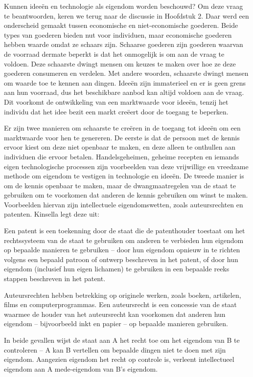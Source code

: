 Kunnen ideeën en technologie als eigendom worden beschouwd? Om deze vraag te beantwoorden, keren we terug naar de discussie in Hoofdstuk 2. Daar werd een onderscheid gemaakt tussen economische en niet-economische goederen. Beide types van goederen bieden nut voor individuen, maar economische goederen hebben waarde omdat ze schaars zijn. Schaarse goederen zijn goederen waarvan de voorraad dermate beperkt is dat het onmogelijk is om aan de vraag te voldoen. Deze schaarste dwingt mensen om keuzes te maken over hoe ze deze goederen consumeren en verdelen. Met andere woorden, schaarste dwingt mensen om waarde toe te kennen aan dingen. Ideeën zijn immaterieel en er is geen grens aan hun voorraad, dus het beschikbare aanbod kan altijd voldoen aan de vraag. Dit voorkomt de ontwikkeling van een marktwaarde voor ideeën, tenzij het individu dat het idee bezit een markt creëert door de toegang te beperken.

Er zijn twee manieren om schaarste te creëren in de toegang tot ideeën om een marktwaarde voor hen te genereren. De eerste is dat de persoon met de kennis ervoor kiest om deze niet openbaar te maken, en deze alleen te onthullen aan individuen die ervoor betalen. Handelsgeheimen, geheime recepten en iemands eigen technologische processen zijn voorbeelden van deze vrijwillige en vreedzame methode om eigendom te vestigen in technologie en ideeën. De tweede manier is om de kennis openbaar te maken, maar de dwangmaatregelen van de staat te gebruiken om te voorkomen dat anderen de kennis gebruiken om winst te maken. Voorbeelden hiervan zijn intellectuele eigendomswetten, zoals auteursrechten en patenten. Kinsella legt deze uit:

\begin{blockquotebox}
    Een patent is een toekenning door de staat die de patenthouder toestaat om het rechtssysteem van de staat te gebruiken om anderen te verbieden hun eigendom op bepaalde manieren te gebruiken -- door hun eigendom opnieuw in te richten volgens een bepaald patroon of ontwerp beschreven in het patent, of door hun eigendom (inclusief hun eigen lichamen) te gebruiken in een bepaalde reeks stappen beschreven in het patent.
    \par\vspace{1em}\noindent
    Auteursrechten hebben betrekking op \textquotesingle originele werken\textquotesingle, zoals boeken, artikelen, films en computerprogramma\textquotesingle s. Een auteursrecht is een concessie van de staat waarmee de houder van het auteursrecht kan voorkomen dat anderen hun eigendom -- bijvoorbeeld inkt en papier -- op bepaalde manieren gebruiken.
    \par\vspace{1em}\noindent
    In beide gevallen wijst de staat aan A het recht toe om het eigendom van B te controleren -- A kan B vertellen om bepaalde dingen niet te doen met zijn eigendom. Aangezien eigendom het recht op controle is, verleent intellectueel eigendom aan A mede-eigendom van B's eigendom.\footnotemark
\end{blockquotebox}

